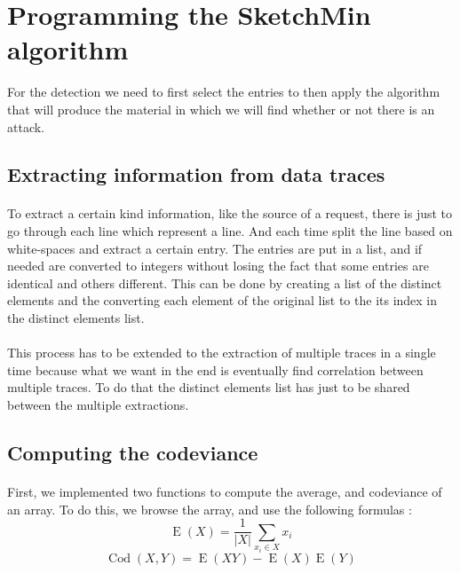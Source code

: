 \documentclass[a4paper]{article}%
\DeclareMathOperator{\E}{E}
\DeclareMathOperator{\Cod}{Cod}
\begin{document}
\section{Programming the SketchMin algorithm}
For the detection we need to first select the entries to then apply the algorithm that will produce the material in which we will find whether or not there is an attack.

\subsection{Extracting information from data traces}

\paragraph{}To extract a certain kind information, like the source of a request, there is just to go through each line which represent a line. And each time split the line based on white-spaces and extract a certain entry. The entries are put in a list, and if needed are converted to integers without losing the fact that some entries are identical and others different. This can be done by creating a list of the distinct elements and the converting each element of the original list to the its index in the distinct elements list.

\paragraph{}This process has to be extended to the extraction of multiple traces in a single time because what we want in the end is eventually find correlation between multiple traces. To do that the distinct elements list has just to be shared between the multiple extractions.

\subsection{Computing the codeviance}
\paragraph{}First, we implemented two functions to compute the average, and codeviance of an array. To do this, we browse the array, and use the following formulas :
	\[ \E(X) = \frac{1}{|X|} \sum\limits_{x_i \in X} x_i \]
	\[ \Cod(X,Y) = \E(XY) - \E(X)\E(Y) \]
	
\end{document}
